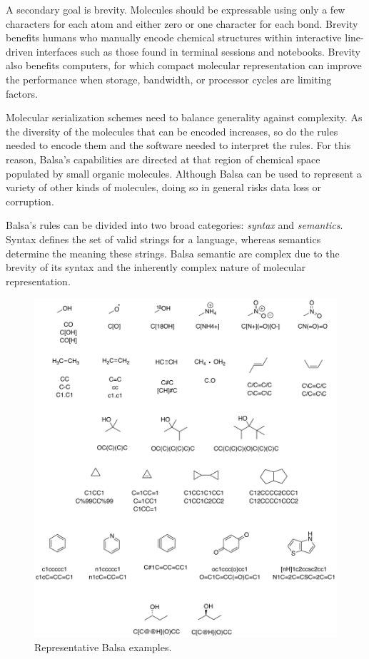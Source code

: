 \documentclass{article}
\begin{document}
A secondary goal is brevity. Molecules should be expressable using only a few characters for each atom and either zero or one character for each bond. Brevity benefits humans who manually encode chemical structures within interactive line-driven interfaces such as those found in terminal sessions and notebooks. Brevity also benefits computers, for which compact molecular representation can improve the performance when storage, bandwidth, or processor cycles are limiting factors.

Molecular serialization schemes need to balance generality against complexity. As the diversity of the molecules that can be encoded increases, so do the rules needed to encode them and the software needed to interpret the rules. For this reason, Balsa's capabilities are directed at that region of chemical space populated by small organic molecules. Although Balsa can be used to represent a variety of other kinds of molecules, doing so in general risks data loss or corruption.

Balsa's rules can be divided into two broad categories: \textit{syntax} and \textit{semantics}. Syntax defines the set of valid strings for a language, whereas semantics determine the meaning these strings. Balsa semantic are complex due to the brevity of its syntax and the inherently complex nature of molecular representation.

\begin{figure}
\centering
\includegraphics[width=\columnwidth]{representative-examples.pdf}
\caption{Representative Balsa examples.}
\label{fig:myfig}
\end{figure}
\end{document}
